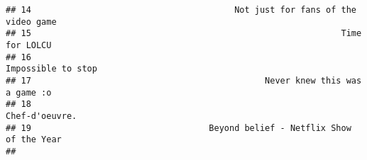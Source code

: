 \documentclass[
]{article}
\begin{document}
\begin{verbatim}
## 14                                        Not just for fans of the video game
## 15                                                             Time for LOLCU
## 16                                                         Impossible to stop
## 17                                              Never knew this was a game :o
## 18                                                             Chef-d'oeuvre.
## 19                                   Beyond belief - Netflix Show of the Year
##                                                                                                                                                                                                                                                                                                                                                                                                                                                                                                                                                                                                                                                                                                                                                                                                                                                                                                                                                                                                                                                                                                                                                                                                                                                                                                                                                                                                                                                                                                                                                                                                                                                                                                                                                                                                                                                                                                                                                                                                                                                                                                                                                                                                                                                                                                                                                                                                                                                                                                                                                                                                                                                                                                                                                                                                                                                                                                                                               
\end{verbatim}
\end{document}
